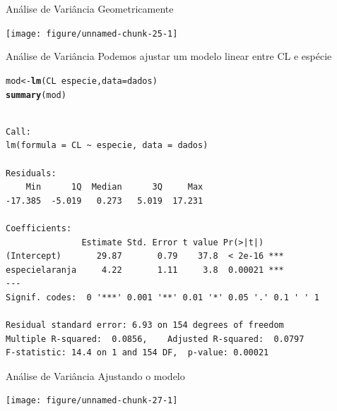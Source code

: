 \documentclass[10pt]{beamer}\usepackage[]{graphicx}\usepackage[]{color}
\makeatletter
\newcommand{\hlopt}[1]{\textcolor[rgb]{0,0,0}{#1}}%
\newcommand{\hlstd}[1]{\textcolor[rgb]{0.345,0.345,0.345}{#1}}%
\newcommand{\hlkwb}[1]{\textcolor[rgb]{0.69,0.353,0.396}{#1}}%
\newcommand{\hlkwc}[1]{\textcolor[rgb]{0.333,0.667,0.333}{#1}}%
\newcommand{\hlkwd}[1]{\textcolor[rgb]{0.737,0.353,0.396}{\textbf{#1}}}%
\newenvironment{kframe}{%
 \def\at@end@of@kframe{}%
 \ifinner\ifhmode%
  \def\at@end@of@kframe{\end{minipage}}%
  \begin{minipage}{\columnwidth}%
 \fi\fi%
 \def\FrameCommand##1{\hskip\@totalleftmargin \hskip-\fboxsep
 \colorbox{shadecolor}{##1}\hskip-\fboxsep
     \hskip-\linewidth \hskip-\@totalleftmargin \hskip\columnwidth}%
 \MakeFramed {\advance\hsize-\width
   \@totalleftmargin\z@ \linewidth\hsize
   \@setminipage}}%
 {\par\unskip\endMakeFramed%
 \at@end@of@kframe}
\newenvironment{knitrout}{}{} %
\theoremstyle{definition}
\makeatother
\begin{document}
\begin{frame}[fragile=singleslide]{Análise de Variância}
Geometricamente
\begin{knitrout}\small
{}\color{fgcolor}

{\centering \texttt{[image: figure/unnamed-chunk-25-1]} 

}



\end{knitrout}
\end{frame}

\begin{frame}[fragile=singleslide]{Análise de Variância}
Podemos ajustar um modelo linear entre CL e espécie
\begin{knitrout}\footnotesize
{}\color{fgcolor}\begin{kframe}
\begin{alltt}
\hlstd{mod} \hlkwb{<-} \hlkwd{lm}\hlstd{(CL} \hlopt{~} \hlstd{especie,} \hlkwc{data} \hlstd{= dados)}
\hlkwd{summary}\hlstd{(mod)}
\end{alltt}
\begin{verbatim}

Call:
lm(formula = CL ~ especie, data = dados)

Residuals:
    Min      1Q  Median      3Q     Max 
-17.385  -5.019   0.273   5.019  17.231 

Coefficients:
               Estimate Std. Error t value Pr(>|t|)    
(Intercept)       29.87       0.79    37.8  < 2e-16 ***
especielaranja     4.22       1.11     3.8  0.00021 ***
---
Signif. codes:  0 '***' 0.001 '**' 0.01 '*' 0.05 '.' 0.1 ' ' 1

Residual standard error: 6.93 on 154 degrees of freedom
Multiple R-squared:  0.0856,	Adjusted R-squared:  0.0797 
F-statistic: 14.4 on 1 and 154 DF,  p-value: 0.00021
\end{verbatim}
\end{kframe}
\end{knitrout}
\end{frame}

\begin{frame}[fragile=singleslide]{Análise de Variância}
Ajustando o modelo
\begin{knitrout}\small
{}\color{fgcolor}

{\centering \texttt{[image: figure/unnamed-chunk-27-1]} 

}



\end{knitrout}
\end{frame}
\end{document}
